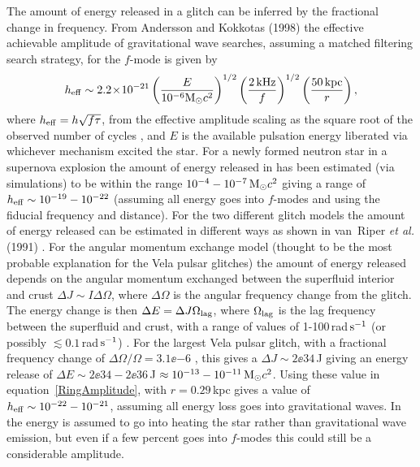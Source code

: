 The amount of energy released in a glitch can be inferred by the fractional change in
frequency. From Andersson and Kokkotas (1998) \cite{AnderssonKokkotas:1998} the effective achievable
amplitude of gravitational wave searches, assuming a matched filtering search strategy, for the
$f$-mode is given by
\begin{equation}\label{RingAmplitude}
h_{\rm eff} \sim 2.2\!\times\!10^{-21}\left( \frac{E}{10^{-6}{\rm M}_{\odot}c^2}\right)^{1/2}\left(
\frac{2\,{\rm kHz}}{f}\right)^{1/2}\left(\frac{50\,{\rm kpc}}{r}\right),
\end{equation}
where $h_{\rm eff} = h\sqrt{f\tau}$, from the effective amplitude scaling as the square root of the
observed number of cycles \cite{Kokkotas:1999}, and $E$ is the available pulsation energy liberated
via whichever mechanism excited the star. For a newly formed neutron star in a supernova explosion
the amount of energy released in \gws has been estimated (via simulations) to be within the range
$10^{-4} - 10^{-7}\,{\rm M}_{\odot}c^2$ giving a range of $h_{\rm eff} \sim 10^{-19} - 10^{-22}$
\cite{Kokkotas:1999} (assuming all energy goes into $f$-modes and using the fiducial frequency and
distance). For the two different glitch models the amount of energy released can be estimated in
different ways as shown in van~Riper {\it et al.} (1991) \cite{vanRiper:1991}. For the angular
momentum exchange model (thought to be the most probable explanation for the Vela pulsar glitches)
the amount of energy released depends on the angular momentum exchanged between the superfluid
interior and crust $\Delta{}J \sim I\Delta\Omega$, where $\Delta\Omega$ is the angular frequency
change from the glitch. The energy change is then $\Delta{}E = \Delta{}J\Omega_{\rm lag}$, where
$\Omega_{\rm lag}$ is the lag frequency between the superfluid and crust, with a range of values of
1-100\,rad\,${\rm s}^{-1}$ (or possibly $\lesssim 0.1$\,rad\,${\rm s}^{-1}$) \cite{vanRiper:1991}.
For the largest Vela pulsar glitch, with a fractional frequency change of $\Delta\Omega/\Omega =
3.1\ee{-6}$ \cite{Dodson:2002}, this gives a $\Delta{}J \sim 2\ee{34}$\,J giving an energy release
of $\Delta{}E \sim 2\ee{34} - 2\ee{36}$\,J $\approx 10^{-13} - 10^{-11}\,{\rm M}_{\odot}c^2$. Using
these value in equation~\ref{RingAmplitude}, with $r = 0.29$\,kpc gives a value of $h_{\rm eff} \sim
10^{-22} - 10^{-21}$, assuming all energy loss goes into gravitational waves. In
\cite{vanRiper:1991} the energy is assumed to go into heating the star rather than gravitational
wave emission, but even if a few percent goes into $f$-modes this could still be a considerable
\gw amplitude. 

